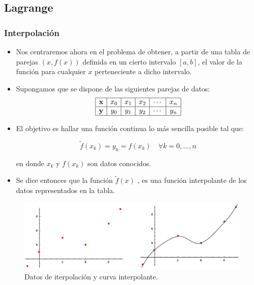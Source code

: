 \documentclass[10pt]{beamer}
\begin{document}
\subsection{Lagrange}
\frame
{
\frametitle{Interpolaci\'on}
\begin{itemize}
 \item<1-> Nos centraremos ahora en el problema de obtener, a partir de una tabla de parejas $(x,f(x))$ definida en un cierto intervalo $[a,b]$, el valor de la funci\'on para cualquier $x$ perteneciente a dicho intervalo.
 
 \item<2-> Supongamos que se dispone de las siguientes parejas de datos:
$$
\begin{array}{|c|c|c|c|c|c|}\hline
  \textbf{x} & x_0 & x_1 & x_2 & \cdots & x_n\\\hline
  \textbf{y} & y_0 & y_1 & y_2 & \cdots & y_n\\\hline
 \end{array}
$$
\end{itemize}
}
\frame
{
  \begin{itemize}
    \item El objetivo es hallar una funci\'on continua lo m\'as sencilla posible tal que:
    \begin{block}{}
    $$
      \widetilde{f}(x_k) = y_k = f(x_k) \quad\forall k = 0,\ldots,n
    $$
    \end{block}
    en donde $x_k$ y $f(x_k)$ son datos conocidos.

    \item<2->Se dice entonces que la funci\'on $\widetilde{f}(x)$ , es una funci\'on interpolante de los datos representados en la tabla.
\end{itemize}
}
\frame
{
\begin{figure}
 \includegraphics[scale=0.37]{img1.eps}
 \caption{Datos de iterpolaci\'on y curva interpolante.}
\end{figure}
}
\end{document}
